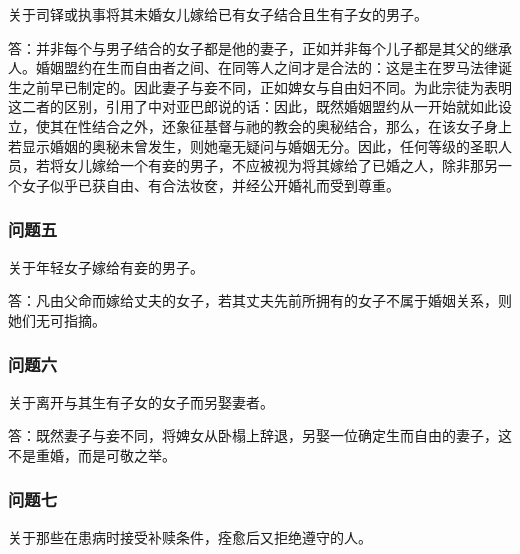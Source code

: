 关于司铎或执事将其未婚女儿嫁给已有女子结合且生有子女的男子。\par

答：并非每个与男子结合的女子都是他的妻子，正如并非每个儿子都是其父的继承人。婚姻盟约在生而自由者之间、在同等人之间才是合法的：这是主在罗马法律诞生之前早已制定的。因此妻子与妾不同，正如婢女与自由妇不同。为此宗徒为表明这二者的区别，引用了中对亚巴郎说的话：因此，既然婚姻盟约从一开始就如此设立，使其在性结合之外，还象征基督与祂的教会的奥秘结合，那么，在该女子身上若显示婚姻的奥秘未曾发生，则她毫无疑问与婚姻无分。因此，任何等级的圣职人员，若将女儿嫁给一个有妾的男子，不应被视为将其嫁给了已婚之人，除非那另一个女子似乎已获自由、有合法妆奁，并经公开婚礼而受到尊重。\par


\subsubsection{问题五}

关于年轻女子嫁给有妾的男子。\par

答：凡由父命而嫁给丈夫的女子，若其丈夫先前所拥有的女子不属于婚姻关系，则她们无可指摘。\par


\subsubsection{问题六}

关于离开与其生有子女的女子而另娶妻者。\par

答：既然妻子与妾不同，将婢女从卧榻上辞退，另娶一位确定生而自由的妻子，这不是重婚，而是可敬之举。\par


\subsubsection{问题七}

关于那些在患病时接受补赎条件，痊愈后又拒绝遵守的人。\par

